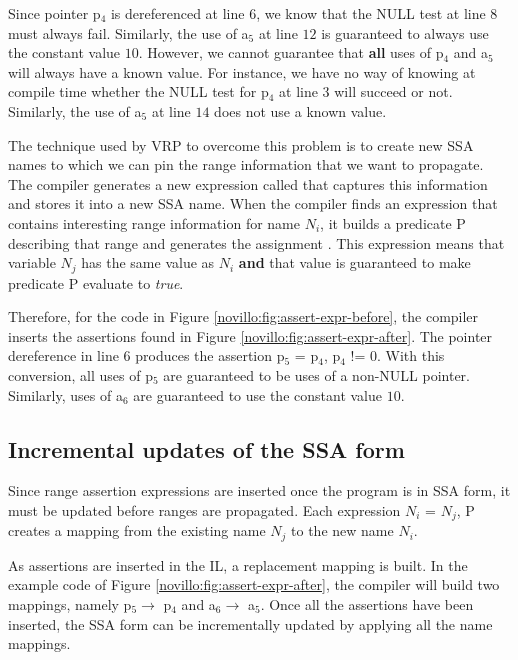 Since pointer p$_4$ is dereferenced at line $6$, we know that the
NULL test at line $8$ must always fail.  Similarly, the use of
a$_5$ at line $12$ is guaranteed to always use the constant value
$10$.  However, we cannot guarantee that \textbf{all} uses of
p$_4$ and a$_5$ will always have a known value.  For instance,
we have no way of knowing at compile time whether the NULL test
for p$_4$ at line $3$ will succeed or not.  Similarly, the use of
a$_5$ at line $14$ does not use a known value.

The technique used by VRP to overcome this problem is to create
new SSA names to which we can pin the range information that we
want to propagate.  The compiler generates a new expression called
 that captures this information and stores it
into a new SSA name.  When the compiler finds an expression that
contains interesting range information for name $N_i$, it
builds a predicate P describing that range and generates
the assignment .  This
expression means that variable $N_j$ has the same value as $N_i$
\textbf{and} that value is guaranteed to make predicate P
evaluate to \textit{true}.

Therefore, for the code in Figure
\ref{novillo:fig:assert-expr-before}, the compiler inserts the
assertions found in Figure \ref{novillo:fig:assert-expr-after}.
The pointer dereference in line $6$ produces the assertion
p$_5$ = p$_4$, p$_4$ != $0$\lcode{>}.  With
this conversion, all uses of p$_5$ are guaranteed to be uses of a
non-NULL pointer.  Similarly, uses of a$_6$ are guaranteed to use
the constant value $10$.

\subsection{Incremental updates of the SSA form}

Since range assertion expressions are inserted once the program
is in SSA form, it must be updated before ranges are propagated.
Each expression $N_i$ = $N_j$, P\lcode{>}
creates a mapping from the existing name $N_j$ to the new name
$N_i$.

As assertions are inserted in the IL, a replacement mapping is
built.  In the example code of Figure
\ref{novillo:fig:assert-expr-after}, the compiler will build two
mappings, namely p$_5 \rightarrow$ p$_4$ and a$_6 \rightarrow$
a$_5$.  Once all the assertions have been inserted, the SSA form
can be incrementally updated by applying all the name mappings.


